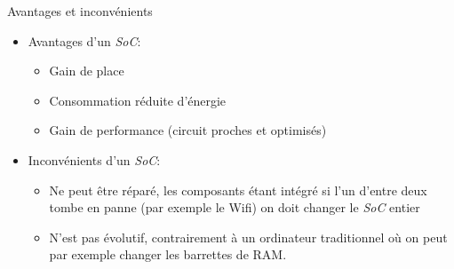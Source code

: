 \documentclass[10pt]{beamer}
\begin{document}
\begin{frame}{\SOC}
	\mframe{\SOC}
	\begin{block}{Avantages et inconvénients}
		\begin{itemize}
			\item<1-> Avantages d'un \textit{SoC}:
			\begin{itemize}
				\item<2-> Gain de place
				\item<3-> Consommation réduite d'énergie
				\item<4-> Gain de performance (circuit proches et optimisés)
			\end{itemize}
			\item<5-> Inconvénients d'un \textit{SoC}:
			\begin{itemize}
				\item<2-> Ne peut être réparé, les composants étant intégré si l'un d'entre deux tombe en panne (par exemple le Wifi) on doit changer le \textit{SoC} entier
				\item<3-> N'est pas évolutif, contrairement à  un ordinateur traditionnel où on peut par exemple changer les barrettes de RAM.
			\end{itemize}
		\end{itemize}
	\end{block}
\end{frame}
\end{document}
